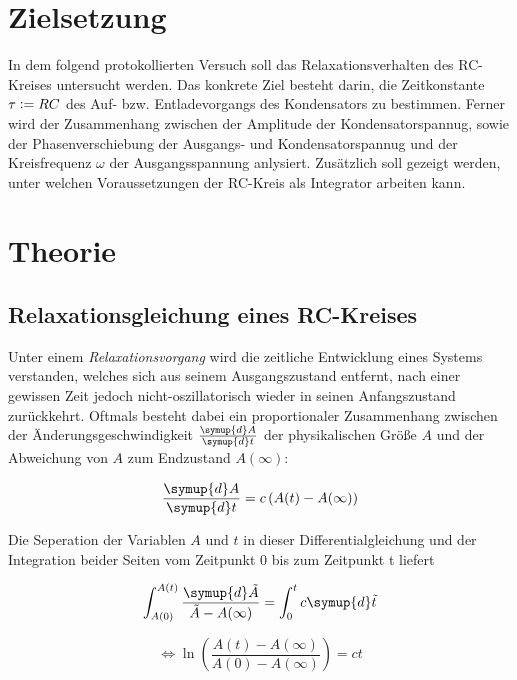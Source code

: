 


\section{Zielsetzung}
\label{sec:Zielsetzung}
In dem folgend protokollierten Versuch soll das Relaxationsverhalten des RC-Kreises untersucht werden. Das konkrete
Ziel besteht darin, die Zeitkonstante $\tau \vcentcolon = RC$ des Auf- bzw. Entladevorgangs des Kondensators zu bestimmen.
Ferner wird der Zusammenhang zwischen der Amplitude der Kondensatorspannug, sowie der Phasenverschiebung der Ausgangs- und
Kondensatorspannug und der Kreisfrequenz $\omega$ der Ausgangsspannung anlysiert. Zusätzlich soll gezeigt werden, unter 
welchen Voraussetzungen der RC-Kreis als Integrator arbeiten kann.

\section{Theorie}
\label{sec:Theorie}

\subsection{Relaxationsgleichung eines RC-Kreises}
Unter einem \emph{Relaxationsvorgang} wird die zeitliche Entwicklung eines Systems verstanden, welches sich aus seinem 
Ausgangszustand entfernt, nach einer gewissen Zeit jedoch nicht-oszillatorisch wieder in seinen Anfangszustand zurückkehrt.
Oftmals besteht dabei ein proportionaler Zusammenhang zwischen der Änderungsgeschwindigkeit $\frac{\symup{d}A}{\symup{d}t}$
der physikalischen Größe $A$ und der Abweichung von $A$ zum Endzustand $A\left(\infty\right)$:

\begin{equation}
    \frac{\symup{d}A}{\symup{d}t} = c\left(A(t) - A(\infty)\right)
\end{equation}

Die Seperation der Variablen $A$ und $t$ in dieser Differentialgleichung und der Integration beider Seiten vom Zeitpunkt 0
bis zum Zeitpunkt t liefert

\begin{equation}
    \int_{A(0)}^{A(t)}\frac{\symup{d}\tilde{A}}{\tilde{A} - A(\infty)} = \int_{0}^{t}c\symup{d}\tilde{t}
\end{equation}

\begin{equation}
    {\Leftrightarrow} \ln\left(\frac{A(t)-A(\infty)}{A(0)-A(\infty)}\right) = ct
\end{equation}

